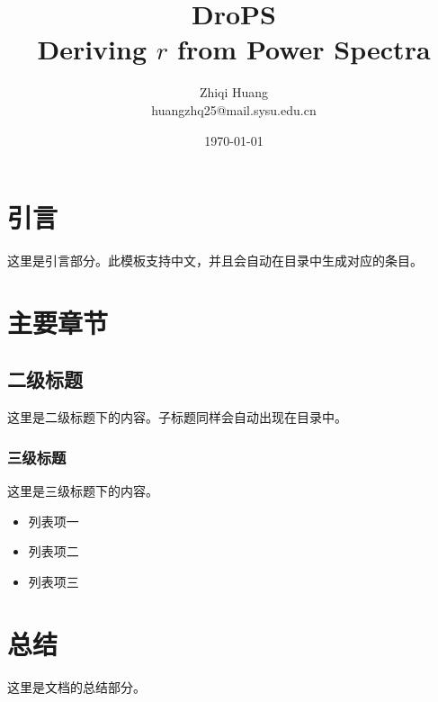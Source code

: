 \documentclass[12pt, a4paper]{ctexart} %
\begin{document}
\thispagestyle{empty}
\title{\Huge \textbf{DroPS}  \\ \huge {\color{blue}D}eriving {\color{blue} $r$} fr{\color{blue}o}m {\color{blue}P}ower {\color{blue}S}pectra}
\author{Zhiqi Huang \\
huangzhq25@mail.sysu.edu.cn}
\date{\today} %
\maketitle %

\thispagestyle{empty} %
\newpage

\tableofcontents
\newpage %

\section{引言} %
这里是引言部分。此模板支持中文，并且会自动在目录中生成对应的条目。

\section{主要章节}
\subsection{二级标题} %
这里是二级标题下的内容。子标题同样会自动出现在目录中。

\subsubsection{三级标题} %
这里是三级标题下的内容。
\begin{itemize}
    \item 列表项一
    \item 列表项二
    \item 列表项三
\end{itemize}

\section{总结}
这里是文档的总结部分。
\end{document}

